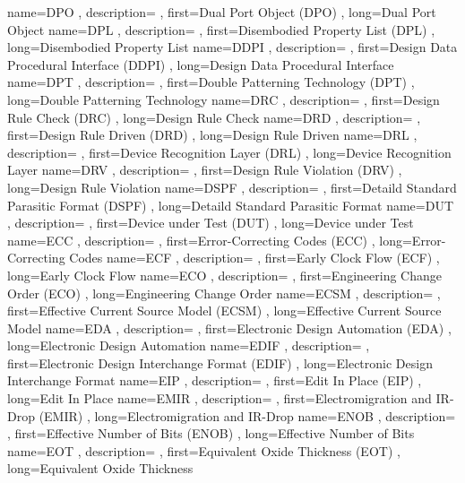 { name={DPO}
, description={}
, first={Dual Port Object (DPO)}
, long={Dual Port Object}
}
{ name={DPL}
, description={}
, first={Disembodied Property List (DPL)}
, long={Disembodied Property List}
}
{ name={DDPI}
, description={}
, first={Design Data Procedural Interface (DDPI)}
, long={Design Data Procedural Interface}
}
{ name={DPT}
, description={}
, first={Double Patterning Technology (DPT)}
, long={Double Patterning Technology}
}
{ name={DRC}
, description={}
, first={Design Rule Check (DRC)}
, long={Design Rule Check}
}
{ name={DRD}
, description={}
, first={Design Rule Driven (DRD)}
, long={Design Rule Driven}
}
{ name={DRL}
, description={}
, first={Device Recognition Layer (DRL)}
, long={Device Recognition Layer}
}
{ name={DRV}
, description={}
, first={Design Rule Violation (DRV)}
, long={Design Rule Violation}
}
{ name={DSPF}
, description={}
, first={Detaild Standard Parasitic Format (DSPF)}
, long={Detaild Standard Parasitic Format}
}
{ name={DUT}
, description={}
, first={Device under Test (DUT)}
, long={Device under Test}
}
{ name={ECC}
, description={}
, first={Error-Correcting Codes (ECC)}
, long={Error-Correcting Codes}
}
{ name={ECF}
, description={}
, first={Early Clock Flow (ECF)}
, long={Early Clock Flow}
}
{ name={ECO}
, description={}
, first={Engineering Change Order (ECO)}
, long={Engineering Change Order}
}
{ name={ECSM}
, description={}
, first={Effective Current Source Model (ECSM)}
, long={Effective Current Source Model}
}
{ name={EDA}
, description={}
, first={Electronic Design Automation (EDA)}
, long={Electronic Design Automation}
}
{ name={EDIF}
, description={}
, first={Electronic Design Interchange Format (EDIF)}
, long={Electronic Design Interchange Format}
}
{ name={EIP}
, description={}
, first={Edit In Place (EIP)}
, long={Edit In Place}
}
{ name={EMIR}
, description={}
, first={Electromigration and IR-Drop (EMIR)}
, long={Electromigration and IR-Drop}
}
{ name={ENOB}
, description={}
, first={Effective Number of Bits (ENOB)}
, long={Effective Number of Bits}
}
{ name={EOT}
, description={}
, first={Equivalent Oxide Thickness (EOT)}
, long={Equivalent Oxide Thickness}
}
